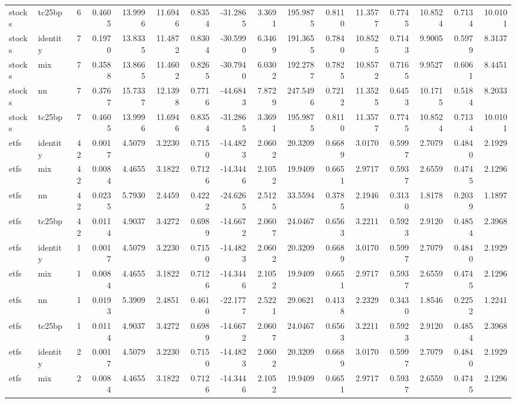 \begin{tabular}{llrrrrrrrrrrrrrr}
stocks & tc25bp & 6 & 0.4605 & 13.9996 & 11.6946 & 0.8354 & -31.2865 & 3.3691 & 195.9875 & 0.8110 & 11.3577 & 0.7745 & 10.8524 & 0.7134 & 10.0101 \\
stocks & identity & 7 & 0.1970 & 13.8335 & 11.4872 & 0.8304 & -30.5990 & 6.3469 & 191.3655 & 0.7840 & 10.8525 & 0.7143 & 9.9005 & 0.5979 & 8.3137 \\
stocks & mix & 7 & 0.3588 & 13.8665 & 11.4602 & 0.8265 & -30.7940 & 6.0302 & 192.2787 & 0.7825 & 10.8572 & 0.7165 & 9.9527 & 0.6061 & 8.4451 \\
stocks & nn & 7 & 0.3767 & 15.7337 & 12.1398 & 0.7716 & -44.6843 & 7.8729 & 247.5496 & 0.7212 & 11.3525 & 0.6453 & 10.1715 & 0.5184 & 8.2033 \\
stocks & tc25bp & 7 & 0.4605 & 13.9996 & 11.6946 & 0.8354 & -31.2865 & 3.3691 & 195.9875 & 0.8110 & 11.3577 & 0.7745 & 10.8524 & 0.7134 & 10.0101 \\
etfs & identity & 42 & 0.0017 & 4.5079 & 3.2230 & 0.7150 & -14.4823 & 2.0602 & 20.3209 & 0.6689 & 3.0170 & 0.5997 & 2.7079 & 0.4840 & 2.1929 \\
etfs & mix & 42 & 0.0084 & 4.4655 & 3.1822 & 0.7126 & -14.3446 & 2.1052 & 19.9409 & 0.6651 & 2.9717 & 0.5937 & 2.6559 & 0.4745 & 2.1296 \\
etfs & nn & 42 & 0.0235 & 5.7930 & 2.4459 & 0.4222 & -24.6265 & 2.5125 & 33.5594 & 0.3785 & 2.1946 & 0.3130 & 1.8178 & 0.2039 & 1.1897 \\
etfs & tc25bp & 42 & 0.0114 & 4.9037 & 3.4272 & 0.6989 & -14.6672 & 2.0607 & 24.0467 & 0.6563 & 3.2211 & 0.5923 & 2.9120 & 0.4854 & 2.3968 \\
etfs & identity & 1 & 0.0017 & 4.5079 & 3.2230 & 0.7150 & -14.4823 & 2.0602 & 20.3209 & 0.6689 & 3.0170 & 0.5997 & 2.7079 & 0.4840 & 2.1929 \\
etfs & mix & 1 & 0.0084 & 4.4655 & 3.1822 & 0.7126 & -14.3446 & 2.1052 & 19.9409 & 0.6651 & 2.9717 & 0.5937 & 2.6559 & 0.4745 & 2.1296 \\
etfs & nn & 1 & 0.0193 & 5.3909 & 2.4851 & 0.4610 & -22.1777 & 2.5221 & 29.0621 & 0.4138 & 2.2329 & 0.3430 & 1.8546 & 0.2252 & 1.2241 \\
etfs & tc25bp & 1 & 0.0114 & 4.9037 & 3.4272 & 0.6989 & -14.6672 & 2.0607 & 24.0467 & 0.6563 & 3.2211 & 0.5923 & 2.9120 & 0.4854 & 2.3968 \\
etfs & identity & 2 & 0.0017 & 4.5079 & 3.2230 & 0.7150 & -14.4823 & 2.0602 & 20.3209 & 0.6689 & 3.0170 & 0.5997 & 2.7079 & 0.4840 & 2.1929 \\
etfs & mix & 2 & 0.0084 & 4.4655 & 3.1822 & 0.7126 & -14.3446 & 2.1052 & 19.9409 & 0.6651 & 2.9717 & 0.5937 & 2.6559 & 0.4745 & 2.1296 \\

\end{tabular}
